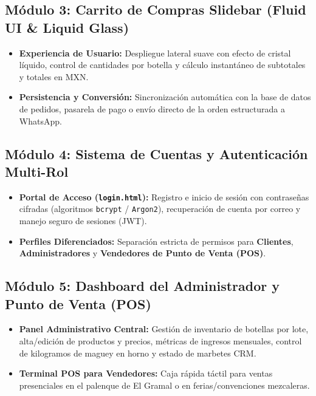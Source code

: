 \documentclass[11pt,letterpaper]{article}
\begin{document}
\subsection{Módulo 3: Carrito de Compras Slidebar (Fluid UI \& Liquid Glass)}
\begin{itemize}[leftmargin=1.5cm]
    \item \textbf{Experiencia de Usuario:} Despliegue lateral suave con efecto de cristal líquido, control de cantidades por botella y cálculo instantáneo de subtotales y totales en MXN.
    \item \textbf{Persistencia y Conversión:} Sincronización automática con la base de datos de pedidos, pasarela de pago o envío directo de la orden estructurada a WhatsApp.
\end{itemize}

\subsection{Módulo 4: Sistema de Cuentas y Autenticación Multi-Rol}
\begin{itemize}[leftmargin=1.5cm]
    \item \textbf{Portal de Acceso (\texttt{login.html}):} Registro e inicio de sesión con contraseñas cifradas (algoritmos \texttt{bcrypt} / \texttt{Argon2}), recuperación de cuenta por correo y manejo seguro de sesiones (JWT).
    \item \textbf{Perfiles Diferenciados:} Separación estricta de permisos para \textbf{Clientes}, \textbf{Administradores} y \textbf{Vendedores de Punto de Venta (POS)}.
\end{itemize}

\subsection{Módulo 5: Dashboard del Administrador y Punto de Venta (POS)}
\begin{itemize}[leftmargin=1.5cm]
    \item \textbf{Panel Administrativo Central:} Gestión de inventario de botellas por lote, alta/edición de productos y precios, métricas de ingresos mensuales, control de kilogramos de maguey en horno y estado de marbetes CRM.
    \item \textbf{Terminal POS para Vendedores:} Caja rápida táctil para ventas presenciales en el palenque de El Gramal o en ferias/convenciones mezcaleras.
\end{itemize}
\end{document}
